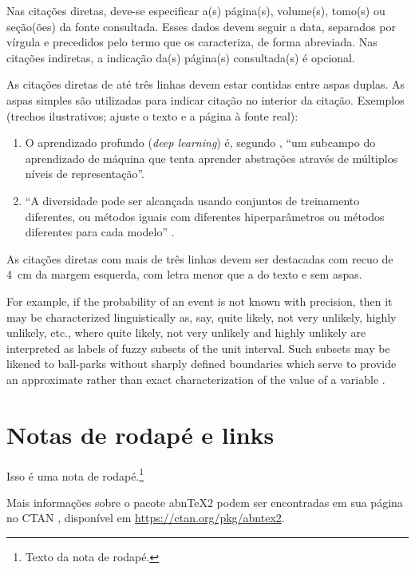 Nas citações diretas, deve-se especificar a(s) página(s), volume(s), tomo(s) ou seção(ões) da fonte consultada. Esses dados devem seguir a data, separados por vírgula e precedidos pelo termo que os caracteriza, de forma abreviada. Nas citações indiretas, a indicação da(s) página(s) consultada(s) é opcional.

As citações diretas de até três linhas devem estar contidas entre aspas duplas. As aspas simples são utilizadas para indicar citação no interior da citação. Exemplos (trechos ilustrativos; ajuste o texto e a página à fonte real):

\begin{enumerate}
	\item O aprendizado profundo (\textit{deep learning}) é, segundo , \enquote{um subcampo do aprendizado de máquina que tenta aprender abstrações através de múltiplos níveis de representação}.
	\item \enquote{A diversidade pode ser alcançada usando conjuntos de treinamento diferentes, ou métodos iguais com diferentes hiperparâmetros ou métodos diferentes para cada modelo} \cite[p.~2]{Polikar2012EnsembleLearning}.
\end{enumerate}

As citações diretas com mais de três linhas devem ser destacadas com recuo de 4~cm da margem esquerda, com letra menor que a do texto e sem aspas.

\begin{citacao}
For example, if the probability of an event is not known with precision, then it may be characterized linguistically as, say, quite likely, not very unlikely, highly unlikely, etc., where quite likely, not very unlikely and highly unlikely are interpreted as labels of fuzzy subsets of the unit interval. Such subsets may be likened to ball-parks without sharply defined boundaries which serve to provide an approximate rather than exact characterization of the value of a variable \cite[p.~202]{zadeh1976fuzzy}.
\end{citacao}

\section{Notas de rodapé e links}

Isso é uma nota de rodapé.\footnote{Texto da nota de rodapé.}

Mais informações sobre o pacote abnTeX2 podem ser encontradas em sua página no CTAN \cite{abntex2ctan}, disponível em \url{https://ctan.org/pkg/abntex2}.

